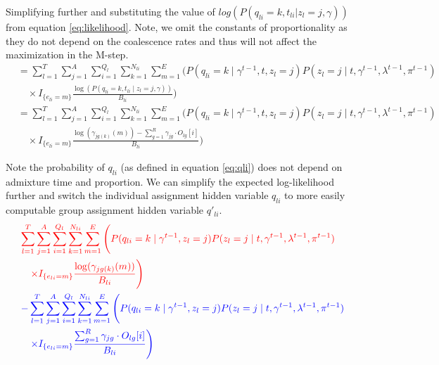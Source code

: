 Simplifying further and substituting the value of $log(P( q_{l i} = k, t_{li} | z_l = j, \gamma ))$ from equation \ref{eq:likelihood}. Note, we omit the constants of proportionality as they do not depend on the coalescence rates and thus will not affect the maximization in the M-step.
\begin{align}
    &= \sum_{l = 1}^T \sum_{j = 1}^A \sum_{i = 1}^{Q_l} \sum_{k = 1}^{N_{li}} \sum_{m = 1}^E \Bigg( 
        P(q_{li} = k \mid \gamma^{t-1}, t, z_l = j) P(z_l = j \mid t, \gamma^{t-1}, \lambda^{t-1}, \pi^{t-1}) \nonumber \\
    &\quad \times I_{\{e_{l i} = m\}} \frac{\log(P(q_{l i} = k, t_{li} \mid z_l = j, \gamma))}{B_{li}} \Bigg) \nonumber \\
    &= \sum_{l = 1}^T \sum_{j = 1}^A \sum_{i = 1}^{Q_l} \sum_{k = 1}^{N_{li}} \sum_{m = 1}^E \Bigg( 
        P(q_{li} = k \mid \gamma^{t-1}, t, z_l = j) P(z_l = j \mid t, \gamma^{t-1}, \lambda^{t-1}, \pi^{t-1}) \nonumber \\
    &\quad \times I_{\{e_{l i} = m\}} \frac{\log(\gamma_{jg(k)}(m)) - \sum_{g=1}^R \gamma_{jg} \cdot O_{lg}[i]}{B_{li}} \Bigg) 
\end{align}

Note the probability of $q_{li}$ (as defined in equation \ref{eq:qli}) does not depend on admixture time and proportion. We can simplify the expected log-likelihood further and switch the individual assignment hidden variable $q_{li}$ to more easily computable group assignment hidden variable $q'_{li}$. 
\begin{align}
   &\color{red}{\sum_{l = 1}^T \sum_{j = 1}^A \sum_{i = 1}^{Q_l} \sum_{k = 1}^{N_{li}} \sum_{m = 1}^E \Bigg( 
       P(q_{li} = k \mid \gamma^{t-1}, z_l = j) P(z_l = j \mid t, \gamma^{t-1}, \lambda^{t-1}, \pi^{t-1})} \nonumber \\
   &\quad \color{red}{\times I_{\{e_{l i} = m\}} \frac{\log(\gamma_{jg(k)}(m))}{B_{li}} \Bigg)} \nonumber \\
   &\color{blue}{- \sum_{l = 1}^T \sum_{j = 1}^A \sum_{i = 1}^{Q_l} \sum_{k = 1}^{N_{li}} \sum_{m = 1}^E \Bigg( 
       P(q_{li} = k \mid \gamma^{t-1}, z_l = j) P(z_l = j \mid t, \gamma^{t-1}, \lambda^{t-1}, \pi^{t-1})} \nonumber \\
   &\quad \color{blue}{\times I_{\{e_{l i} = m\}} \frac{\sum_{g=1}^R \gamma_{jg} \cdot O_{lg}[i]}{B_{li}} \Bigg)}
\end{align}

